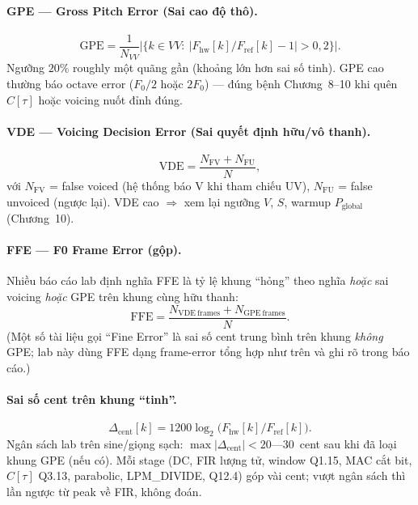 \paragraph{GPE --- Gross Pitch Error (Sai cao độ thô).}
\begin{equation}
\label{eq:ch13_gpe}
\mathrm{GPE}=\frac{1}{N_{VV}}\bigl|\bigl\{k\in VV:\ \bigl|F_{\mathrm{hw}}[k]/F_{\mathrm{ref}}[k]-1\bigr|>0{,}2\bigr\}\bigr|.
\end{equation}
Ngưỡng $20\%$ roughly một quãng gần (khoảng lớn hơn sai số tinh). GPE cao thường báo octave error ($F_0/2$ hoặc $2F_0$) --- đúng bệnh Chương~8--10 khi quên $C[\tau]$ hoặc voicing nuốt đỉnh đúng.

\paragraph{VDE --- Voicing Decision Error (Sai quyết định hữu/vô thanh).}
\begin{equation}
\label{eq:ch13_vde}
\mathrm{VDE}=\frac{N_{\mathrm{FV}}+N_{\mathrm{FU}}}{N},
\end{equation}
với $N_{\mathrm{FV}}$ = false voiced (hệ thống báo V khi tham chiếu UV), $N_{\mathrm{FU}}$ = false unvoiced (ngược lại). VDE cao $\Rightarrow$ xem lại ngưỡng $V$, $S$, warmup $P_{\mathrm{global}}$ (Chương~10).

\paragraph{FFE --- F0 Frame Error (gộp).}
Nhiều báo cáo lab định nghĩa FFE là tỷ lệ khung ``hỏng'' theo nghĩa \emph{hoặc} sai voicing \emph{hoặc} GPE trên khung cùng hữu thanh:
\begin{equation}
\label{eq:ch13_ffe}
\mathrm{FFE}=\frac{N_{\mathrm{VDE\ frames}}+N_{\mathrm{GPE\ frames}}}{N}.
\end{equation}
(Một số tài liệu gọi ``Fine Error'' là sai số cent trung bình trên khung \emph{không} GPE; lab này dùng FFE dạng frame-error tổng hợp như trên và ghi rõ trong báo cáo.)

\paragraph{Sai số cent trên khung ``tinh''.}
\begin{equation}
\Delta_{\mathrm{cent}}[k]=1200\log_2\bigl(F_{\mathrm{hw}}[k]/F_{\mathrm{ref}}[k]\bigr).
\end{equation}
Ngân sách lab trên sine/giọng sạch: $\max|\Delta_{\mathrm{cent}}| < 20$---$30$~cent sau khi đã loại khung GPE (nếu có). Mỗi stage (DC, FIR lượng tử, window Q1.15, MAC cắt bit, $C[\tau]$ Q3.13, parabolic, LPM\_DIVIDE, Q12.4) góp vài cent; vượt ngân sách thì lần ngược từ peak về FIR, không đoán.

